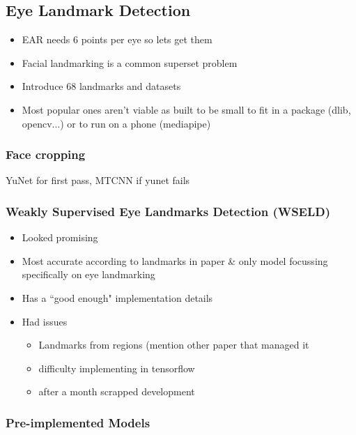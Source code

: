\subsection{Eye Landmark Detection}

\begin{itemize}
    \item EAR needs 6 points per eye so lets get them
    \item Facial landmarking is a common superset problem
    \item Introduce 68 landmarks and datasets
    \item Most popular ones aren't viable as built to be small to fit in a package (dlib, opencv...) or to run on a phone (mediapipe)
\end{itemize}

\subsubsection{Face cropping}

YuNet for first pass, MTCNN if yunet fails

\subsubsection{Weakly Supervised Eye Landmarks Detection (WSELD)}

\begin{itemize}
    \item Looked promising
    \item Most accurate according to landmarks in paper \& only model focussing specifically on eye landmarking
    \item Has a ``good enough" implementation details
    \item Had issues
    \begin{itemize}
        \item Landmarks from regions (mention other paper that managed it
        \item difficulty implementing in tensorflow
        \item after a month scrapped development
    \end{itemize}
\end{itemize}

\subsubsection{Pre-implemented Models}

